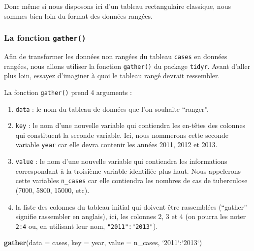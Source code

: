 \documentclass[a4paperpaper,]{article}
\newenvironment{Shaded}{\begin{snugshade}}{\end{snugshade}}
\newcommand{\DataTypeTok}[1]{\textcolor[rgb]{0.00,0.34,0.68}{#1}}
\newcommand{\KeywordTok}[1]{\textcolor[rgb]{0.12,0.11,0.11}{\textbf{#1}}}
\newcommand{\NormalTok}[1]{\textcolor[rgb]{0.12,0.11,0.11}{#1}}
\newcommand{\OperatorTok}[1]{\textcolor[rgb]{0.12,0.11,0.11}{#1}}
\newcommand{\StringTok}[1]{\textcolor[rgb]{0.75,0.01,0.01}{#1}}
\providecommand{\tightlist}{%
  \setlength{\itemsep}{0pt}\setlength{\parskip}{0pt}}
\theoremstyle{definition}
\theoremstyle{definition}
\theoremstyle{definition}
\theoremstyle{remark}
\begin{document}
Donc même si nous disposons ici d'un tableau rectangulaire classique,
nous sommes bien loin du format des données rangées.

\hypertarget{la-fonction-gather}{%
\subsubsection{\texorpdfstring{La fonction
\texttt{gather()}}{La fonction gather()}}\label{la-fonction-gather}}

Afin de transformer les données non rangées du tableau \texttt{cases} en
données rangées, nous allons utiliser la fonction \texttt{gather()} du
package \texttt{tidyr}. Avant d'aller plus loin, essayez d'imaginer à
quoi le tableau rangé devrait ressembler.

La fonction \texttt{gather()} prend 4 arguments :

\begin{enumerate}
\def\labelenumi{\arabic{enumi}.}
\tightlist
\item
  \texttt{data} : le nom du tableau de données que l'on souhaite
  ``ranger''.
\item
  \texttt{key} : le nom d'une nouvelle variable qui contiendra les
  en-têtes des colonnes qui constituent la seconde variable. Ici, nous
  nommerons cette seconde variable \texttt{year} car elle devra contenir
  les années 2011, 2012 et 2013.
\item
  \texttt{value} : le nom d'une nouvelle variable qui contiendra les
  informations correspondant à la troisième variable identifiée plus
  haut. Nous appelerons cette variables \texttt{n\_cases} car elle
  contiendra les nombres de cas de tuberculose (7000, 5800, 15000, etc).
\item
  la liste des colonnes du tableau initial qui doivent être rassemblées
  (``gather'' signifie rassembler en anglais), ici, les colonnes 2, 3 et
  4 (on pourra les noter \texttt{2:4} ou, en utilisant leur nom,
  \texttt{"2011":"2013"}).
\end{enumerate}

\begin{Shaded}
\begin{Highlighting}[]
\KeywordTok{gather}\NormalTok{(}\DataTypeTok{data =}\NormalTok{ cases, }\DataTypeTok{key =}\NormalTok{ year, }\DataTypeTok{value =}\NormalTok{ n_cases, }\StringTok{`}\DataTypeTok{2011}\StringTok{`}\OperatorTok{:}\StringTok{`}\DataTypeTok{2013}\StringTok{`}\NormalTok{)}
\end{Highlighting}
\end{Shaded}
\end{document}
